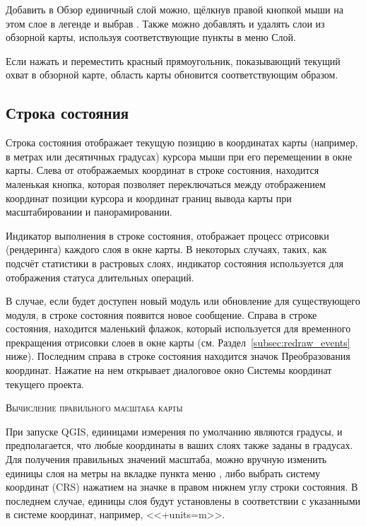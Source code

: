 Добавить в Обзор единичный слой можно, щёлкнув правой кнопкой мыши на этом
слое в легенде и выбрав . Также можно
добавлять и удалять слои из обзорной карты, используя соответствующие
пункты в меню Слой.

Если нажать и переместить красный прямоугольник, показывающий текущий охват
в обзорной карте, область карты обновится соответствующим образом.

\subsection{Строка состояния}\label{label_statusbar}

Строка состояния отображает текущую позицию в координатах карты (например,
в метрах или десятичных градусах) курсора мыши при его перемещении в окне
карты. Слева от отображаемых координат в строке состояния, находится
маленькая кнопка, которая позволяет переключаться между отображением
координат позиции курсора и координат границ вывода карты при
масштабировании и панорамировании.

Индикатор выполнения в строке состояния, отображает процесс отрисовки
(рендеринга) каждого слоя в окне карты. В некоторых случаях, таких, как
подсчёт статистики в растровых слоях, индикатор состояния используется
для отображения статуса длительных операций.

В случае, если будет доступен новый модуль или обновление для
существующего модуля, в строке состояния появится новое сообщение. Справа
в строке состояния, находится маленький флажок, который используется для
временного прекращения отрисовки слоев в окне карты
(см. Раздел~\ref{subsec:redraw_events} ниже). Последним справа в строке
состояния находится значок Преобразования координат. Нажатие на нем
открывает диалоговое окно Системы координат текущего проекта.

\begin{Tip}\caption{\textsc{Вычисление правильного масштаба карты}}
При запуске QGIS, единицами измерения по умолчанию являются градусы, и предполагается,
что любые координаты в ваших слоях также заданы в градусах. Для
получения правильных значений масштаба, можно вручную изменить единицы
слоя на метры на вкладке  пункта меню 
\arrow {}, либо выбрать систему
координат (CRS) нажатием на значке
 в правом
нижнем углу строки состояния. В последнем случае, единицы слоя
будут установлены в соответствии с указанными в системе координат,
например, <<+units=m>>.
\end{Tip}

